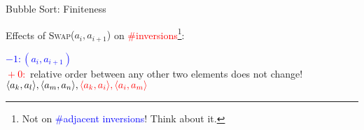 \begin{frame}{Bubble Sort: Finiteness}
  \begin{center}
  \end{center}

  \pause
  Effects of \textsc{Swap}{($a_{i}, a_{i+1}$)} on \textcolor{red}{\#inversions}\footnote{Not on \textcolor{blue}{\#adjacent inversions}! Think about it.}:

  \pause
  \begin{center}
	\textcolor{blue}{$-1: (a_{i},a_{i+1})$}\\[3pt] \pause 
	\textcolor{red}{${}+{}0:$} relative order between any other two elements does not change!\\[3pt]
	$\langle a_k, a_l \rangle, \langle a_m, a_n \rangle, \textcolor{red}{\langle a_k, a_i \rangle, \langle a_i, a_m \rangle}$
  \end{center}

  \pause
  \begin{center}
  \end{center}
\end{frame}
